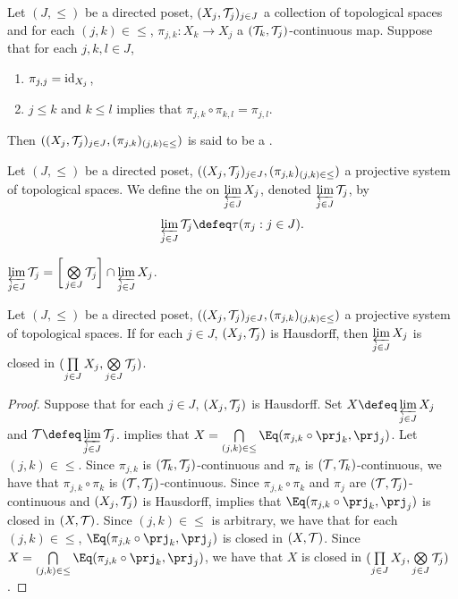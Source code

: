 \documentclass{book}
\begin{document}
\begin{defn} 
	Let $(J, \leq)$ be a directed poset, $(X_j, \mathcal{T}_j)_{j \in J}$ a collection of topological spaces and for each $(j,k) \in {\leq}$, $\pi_{j,k}:X_k \rightarrow X_j$ a $(\mathcal{T}_k, \mathcal{T}_j)$-continuous map. Suppose that for each $j,k,l \in J$, 
	\begin{enumerate}
		\item $\pi_{j,j} = \operatorname{id}_{X_j}$,
		\item $j \leq k$ and $k \leq l$ implies that $\pi_{j,k} \circ \pi_{k,l} = \pi_{j,l}$.
	\end{enumerate}
	Then $((X_j, \mathcal{T}_j)_{j \in J}, (\pi_{j,k})_{(j,k) \in \leq})$ is said to be a .
\end{defn}

\begin{defn} 
	Let $(J, \leq)$ be a directed poset, $((X_j, \mathcal{T}_j)_{j \in J}, (\pi_{j,k})_{(j,k) \in \leq})$ a projective system of topological spaces. We define the  on $\varprojlim\limits_{j \in J} X_j$, denoted $\varprojlim\limits_{j \in J} \mathcal{T}_j$, by $$\varprojlim\limits_{j \in J} \MT_j \defeq \tau(\pi_j: j \in J).$$
\end{defn}

\begin{ex} 
	$\varprojlim\limits_{j \in J}  \mathcal{T}_j = \bigg[ \bigotimes\limits_{j \in J} \mathcal{T}_j \bigg] \cap \varprojlim\limits_{j \in J} X_j$.
\end{ex}


\begin{ex} 
	Let $(J, \leq)$ be a directed poset, $((X_j, \mathcal{T}_j)_{j \in J}, (\pi_{j,k})_{(j,k) \in \leq})$ a projective system of topological spaces. If for each $j \in J$, $(X_j, \mathcal{T}_j)$ is Hausdorff, then $\varprojlim\limits_{j \in J} X_j$ is closed in $(\prod\limits_{j \in J} X_j, \bigotimes\limits_{j \in J} \mathcal{T}_j)$.
\end{ex}

\begin{proof}
	Suppose that for each $j \in J$, $(X_j, \mathcal{T}_j)$ is Hausdorff. Set $X \defeq \varprojlim\limits_{j \in J} X_j$ and $\MT \defeq \varprojlim\limits_{j \in J} \MT_j$.  implies that $X = \bigcap\limits_{(j,k) \in {\leq}} \Eq( \pi_{j,k} \circ \prj_k,  \prj_j)$. Let $(j,k) \in {\leq}$. Since $\pi_{j,k}$ is $(\mathcal{T}_k, \mathcal{T}_j)$-continuous and $\pi_k$ is $(\mathcal{T}, \mathcal{T}_k)$-continuous, we have that $\pi_{j,k} \circ \pi_k$ is $(\mathcal{T}, \mathcal{T}_j)$-continuous. Since $\pi_{j,k} \circ \pi_k$ and $\pi_j$ are $(\mathcal{T}, \mathcal{T}_j)$-continuous and $(X_j, \mathcal{T}_j)$ is Hausdorff,  implies that $\Eq( \pi_{j,k} \circ \prj_k,  \prj_j)$ is closed in $(X, \mathcal{T})$. Since $(j,k) \in {\leq}$ is arbitrary, we have that for each $(j,k) \in {\leq}$, $\Eq( \pi_{j,k} \circ \prj_k,  \prj_j)$ is closed in $(X, \mathcal{T})$. Since $X = \bigcap\limits_{(j,k) \in {\leq}} \Eq( \pi_{j,k} \circ \prj_k,  \prj_j)$, we have that $X$ is closed in $(\prod\limits_{j \in J} X_j, \bigotimes\limits_{j \in J} \mathcal{T}_j)$.
\end{proof}
\end{document}
